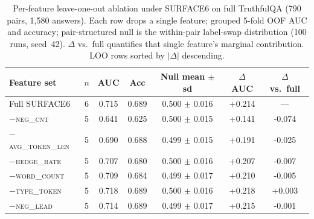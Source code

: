 \begin{table}[t]
\centering
\small
\caption{Per-feature leave-one-out ablation under SURFACE6 on full TruthfulQA (790 pairs, 1{,}580 answers). Each row drops a single feature; grouped 5-fold OOF AUC and accuracy; pair-structured null is the within-pair label-swap distribution (100 runs, seed~42). $\Delta$ vs.\ full quantifies that single feature's marginal contribution. LOO rows sorted by $|\Delta|$ descending.}
\label{tab:surface6_ablation_per_feature}
\begin{tabular}{lcccccc}
\toprule
Feature set & $n$ & AUC & Acc & Null mean $\pm$ sd & $\Delta$AUC & $\Delta$ vs.\ full \\
\midrule
Full SURFACE6 & 6 & 0.715 & 0.689 & 0.500 $\pm$ 0.016 & +0.214 & --- \\
$-$\textsc{neg\_cnt} & 5 & 0.641 & 0.625 & 0.500 $\pm$ 0.015 & +0.141 & -0.074 \\
$-$\textsc{avg\_token\_len} & 5 & 0.690 & 0.688 & 0.499 $\pm$ 0.015 & +0.191 & -0.025 \\
$-$\textsc{hedge\_rate} & 5 & 0.707 & 0.680 & 0.500 $\pm$ 0.016 & +0.207 & -0.007 \\
$-$\textsc{word\_count} & 5 & 0.709 & 0.684 & 0.499 $\pm$ 0.017 & +0.210 & -0.005 \\
$-$\textsc{type\_token} & 5 & 0.718 & 0.689 & 0.500 $\pm$ 0.016 & +0.218 & +0.003 \\
$-$\textsc{neg\_lead} & 5 & 0.714 & 0.689 & 0.499 $\pm$ 0.017 & +0.215 & -0.001 \\
\bottomrule
\end{tabular}
\end{table}
